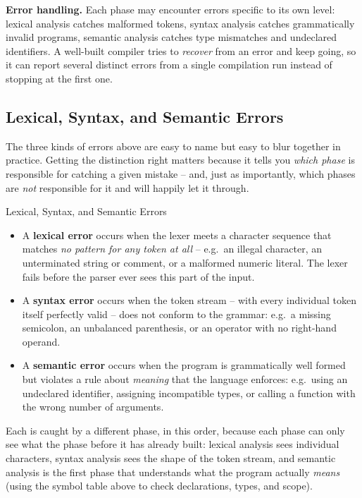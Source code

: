 \documentclass[full-course-notes.tex]{subfiles}
\begin{document}
\textbf{Error handling.} Each phase may encounter errors specific to its own level: lexical
analysis catches malformed tokens, syntax analysis catches grammatically invalid programs,
semantic analysis catches type mismatches and undeclared identifiers. A well-built compiler
tries to \emph{recover} from an error and keep going, so it can report several distinct errors
from a single compilation run instead of stopping at the first one.

\subsection{Lexical, Syntax, and Semantic Errors}
\label{sec:l2-error-kinds}

\dbtag The three kinds of errors above are easy to name but easy to blur together in practice.
Getting the distinction right matters because it tells you \emph{which phase} is responsible for
catching a given mistake -- and, just as importantly, which phases are \emph{not} responsible
for it and will happily let it through.

\begin{defbox}{Lexical, Syntax, and Semantic Errors}
\begin{itemize}
  \item A \textbf{lexical error} occurs when the lexer meets a character sequence that matches
  \emph{no pattern for any token at all} -- e.g.\ an illegal character, an unterminated string
  or comment, or a malformed numeric literal. The lexer fails before the parser ever sees this
  part of the input.
  \item A \textbf{syntax error} occurs when the token stream -- with every individual token
  itself perfectly valid -- does not conform to the grammar: e.g.\ a missing semicolon, an
  unbalanced parenthesis, or an operator with no right-hand operand.
  \item A \textbf{semantic error} occurs when the program is grammatically well formed but
  violates a rule about \emph{meaning} that the language enforces: e.g.\ using an undeclared
  identifier, assigning incompatible types, or calling a function with the wrong number of
  arguments.
\end{itemize}
Each is caught by a different phase, in this order, because each phase can only see what the
phase before it has already built: lexical analysis sees individual characters, syntax analysis
sees the shape of the token stream, and semantic analysis is the first phase that understands
what the program actually \emph{means} (using the symbol table above to check declarations,
types, and scope).
\end{defbox}
\end{document}
